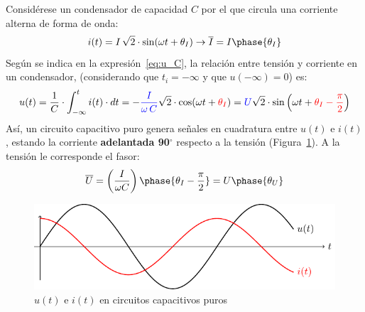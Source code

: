 Considérese un condensador de capacidad $C$ por el que circula una
corriente alterna de forma de onda:
\begin{equation*}
  i(t)=I\,\sqrt{2}\cdot\sin(\omega t+\theta_I)\rightarrow\overline{I}=I\phase{\theta_I}
\end{equation*}
Según se indica en la expresión~\eqref{eq:u_C}, la relación entre
tensión y corriente en un condensador, (considerando que $t_i=-\infty$
y que $u(-\infty)=0$) es:
\begin{equation*}
  u(t)=\dfrac{1}{C}\cdot\int_{-\infty}^{t} i(t)\cdot dt=-{\color{blue}\dfrac{I}{\omega\,C}}\sqrt{2}\cdot\cos (\omega t+{\color{red}\theta_I})={\color{blue}U}\sqrt{2}\cdot\sin \left(\omega t+{\color{red}\theta_I-\frac{\pi}{2}}\right)
\end{equation*}
Así, un circuito capacitivo puro genera señales en cuadratura entre
$u(t)$ e $i(t)$, estando la corriente \textbf{adelantada 90$^\circ$}
respecto a la tensión (Figura~\ref{fig:capacitivoPuro}). A la tensión
le corresponde el fasor:
\begin{equation*}
  \overline{U}=\left( \dfrac{I}{\omega C} \right)\phase{\theta_I-\frac{\pi}{2}}=U\phase{\theta_U}
\end{equation*}
\begin{figure}[H]
  \centering \includegraphics{../figs/capacitivoPuro.pdf}
  \caption{$u(t)$ e $i(t)$ en circuitos capacitivos puros}
  \label{fig:capacitivoPuro}
\end{figure}
	
